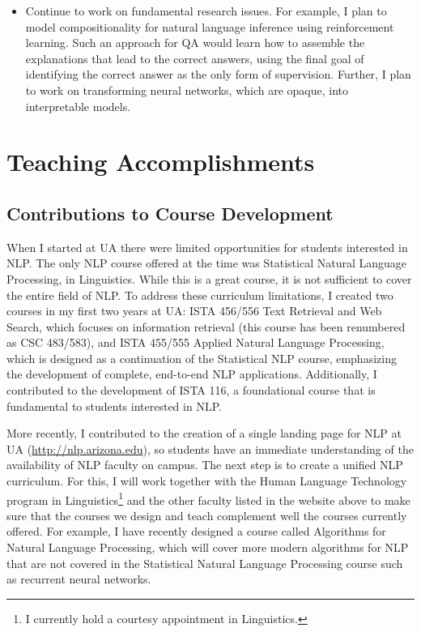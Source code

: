 \documentclass[10pt]{article}
\begin{document}
\begin{itemize}
\item Continue to work on fundamental research issues. For example, I plan to model compositionality for natural language inference using reinforcement learning. Such an approach for QA would learn how to assemble the explanations that lead to the correct answers, using the final goal of identifying the correct answer as the only form of supervision. Further, I plan to work on transforming neural networks, which are opaque, into interpretable models. 
\end{itemize}

\section{Teaching Accomplishments}

\subsection*{Contributions to Course Development}

When I started at UA there were limited opportunities for students interested in NLP. The only NLP course offered at the time was Statistical Natural Language Processing, in Linguistics. While this is a great course, it is not sufficient to cover the entire field of NLP. 
To address these curriculum limitations, I created two courses in my first two years at UA: ISTA 456/556 Text Retrieval and Web Search, which focuses on information retrieval (this course has been renumbered as CSC 483/583), and ISTA 455/555 Applied Natural Language Processing, which is designed as a continuation of the Statistical NLP course, emphasizing the development of complete, end-to-end NLP applications.  Additionally, I contributed to the development of ISTA 116, a foundational course that is fundamental to students interested in NLP.

More recently, I contributed to the creation of a single landing page for NLP at UA (\url{http://nlp.arizona.edu}), so students have an immediate understanding of the availability of NLP faculty on campus. The next step is to create a unified NLP curriculum. For this, I will work together with the Human Language Technology program in Linguistics\footnote{I currently hold a courtesy appointment in Linguistics.} and the other faculty listed in the website above to make sure that the courses we design and teach complement well the courses currently offered. For example, I have recently designed a course called Algorithms for Natural Language Processing, which will cover more modern algorithms for NLP that are not covered in the Statistical Natural Language Processing course such as recurrent neural networks.
\end{document}
